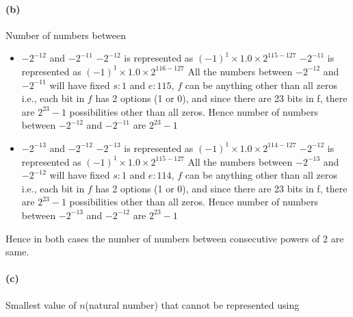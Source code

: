 \documentclass{article}
\begin{document}
\paragraph{(b)} Number of numbers between
\begin{itemize}
\item $-2^{-12}$ and $-2^{-11}$\newline\newline
  $-2^{-12}$ is represented as $(-1)^1 \times 1.0 \times 2^{115 - 127}$
  $-2^{-11}$ is represented as $(-1)^1 \times 1.0 \times 2^{116 - 127}$
  \newline\newline
  All the numbers between $-2^{-12}$ and $-2^{-11}$ will have fixed $s: 1$ and $e: 115$, $f$ can be anything other than all zeros i.e., each bit in $f$ has 2 options (1 or 0), and since there are 23 bits in f, there are $2^{23} - 1$ possibilities other than all zeros.
  \newline
  Hence number of numbers between $-2^{-12}$ and $-2^{-11}$ are $2^{23} - 1$
  \newline\newline

\item $-2^{-13}$ and $-2^{-12}$\newline\newline
  $-2^{-13}$ is represented as $(-1)^1 \times 1.0 \times 2^{114 - 127}$
  $-2^{-12}$ is represented as $(-1)^1 \times 1.0 \times 2^{115 - 127}$
  \newline\newline
  All the numbers between $-2^{-13}$ and $-2^{-12}$ will have fixed $s: 1$ and $e: 114$, $f$ can be anything other than all zeros i.e., each bit in $f$ has 2 options (1 or 0), and since there are 23 bits in f, there are $2^{23} - 1$ possibilities other than all zeros.
  \newline
  Hence number of numbers between $-2^{-13}$ and $-2^{-12}$ are $2^{23} - 1$
\end{itemize}

Hence in both cases the number of numbers between consecutive powers of 2 are same.

\paragraph{(c)} Smallest value of $n$(natural number) that cannot be represented using
\end{document}
